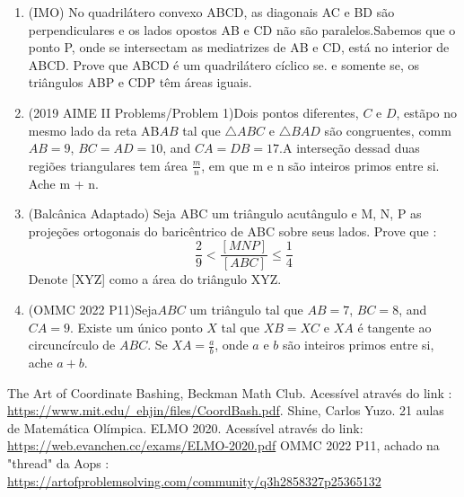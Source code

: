 \documentclass{article}
\begin{document}
\begin{enumerate}
    \item (IMO) No quadrilátero convexo ABCD, as diagonais AC e BD são perpendiculares e os  lados opostos AB e CD não são paralelos.Sabemos que o ponto P, onde se intersectam as mediatrizes de AB e CD, está no interior de ABCD. Prove que ABCD é um quadrilátero cíclico se. e somente se, os triângulos ABP e CDP têm áreas iguais.
    \item 
    (2019 AIME II Problems/Problem 1)Dois pontos diferentes, $C$ e $D$, estãpo no mesmo lado da reta AB$AB$ tal que $\triangle ABC$ e $\triangle BAD$ são congruentes, comm $AB = 9$, $BC=AD=10$, and $CA=DB=17$.A interseção dessad duas regiões triangulares tem área $\frac{m}{n}$, em que m e n são inteiros primos entre si. Ache m + n.
    \item
    (Balcânica Adaptado) Seja ABC um triângulo acutângulo e M, N, P as projeções ortogonais  do baricêntrico de ABC sobre seus lados. Prove que : 
    $$
    \frac{2}{9} < \frac{[MNP]}{[ABC]} \leq \frac{1}{4}
    $$
    Denote [XYZ] como a área do triângulo XYZ.
    \item 
    (OMMC 2022 P11)Seja$ABC$ um triângulo tal que $AB = 7$, $BC = 8$, and $CA = 9$. Existe um único ponto $X$ tal que $XB = XC$ e $XA$ é tangente ao circuncírculo de $ABC$. Se $XA = \tfrac ab$, onde $a$ e $b$ são inteiros primos entre si, ache $a + b$.
\end{enumerate}


\begin{thebibliography}{9}
The Art of Coordinate Bashing, Beckman Math Club. Acessível através do link : \href{https://www.mit.edu/~ehjin/files/CoordBash.pdf}{https://www.mit.edu/~ehjin/files/CoordBash.pdf}.
Shine, Carlos Yuzo. 21 aulas de Matemática Olímpica.
ELMO 2020. Acessível através do link:
\href{https://web.evanchen.cc/exams/ELMO-2020.pdf}{https://web.evanchen.cc/exams/ELMO-2020.pdf}
OMMC 2022 P11, achado na "thread" da Aops : \href{https://artofproblemsolving.com/community/q3h2858327p25365132}{https://artofproblemsolving.com/community/q3h2858327p25365132}
\end{thebibliography}
\end{document}
